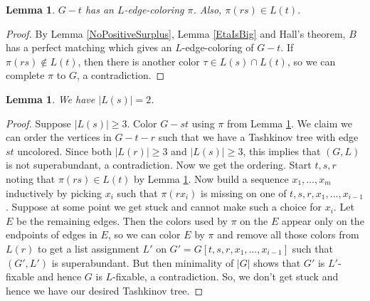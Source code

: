 \documentclass[12pt]{article}
\theoremstyle{plain}
\newtheorem{lem}[thm]{Lemma}
\theoremstyle{definition}
\theoremstyle{remark}
\begin{document}
	
	\begin{lem}\label{CanColorG-t}
		$G-t$ has an $L$-edge-coloring $\pi$.  Also, $\pi(rs) \in L(t)$.
	\end{lem}
	\begin{proof}
		By Lemma \ref{NoPositiveSurplus}, Lemma \ref{EtaIsBig} and Hall's theorem, $B$ has a perfect matching which gives an $L$-edge-coloring of $G-t$.  If $\pi(rs) \not \in L(t)$, then there is another color $\tau \in L(s) \cap L(t)$, so we can complete $\pi$ to $G$, a contradiction.
	\end{proof}
	
	\begin{lem}\label{SIsSmall}
		We have $|L(s)| = 2$.
	\end{lem}
	\begin{proof}
		Suppose $|L(s)| \ge 3$.  Color $G-st$ using $\pi$ from Lemma \ref{CanColorG-t}.  We claim we can order the vertices in $G-t-r$ such that we have a Tashkinov tree with edge $st$ uncolored.  Since both $|L(r)| \ge 3$ and $|L(s)| \ge 3$, this implies that $(G,L)$ is not superabundant, a contradiction.  Now we get the ordering. Start $t,s,r$ noting that $\pi(rs) \in L(t)$ by Lemma \ref{CanColorG-t}.  Now build a sequence $x_1, \ldots, x_m$ inductively by picking $x_i$ such that $\pi(rx_i)$ is missing on one of $t,s,r,x_1, \ldots, x_{i-1}$.  Suppose at some point we get stuck and cannot make such a choice for $x_i$.  Let $E$ be the remaining edges. Then the colors used by $\pi$ on the $E$ appear only on the endpoints of edges in $E$, so we can color $E$ by $\pi$ and remove all those colors from $L(r)$ to get a list assignment $L'$ on $G' = G[t,s,r, x_1, \ldots, x_{i-1}]$ such that $(G', L')$ is superabundant.  But then minimality of $|G|$ shows that $G'$ is $L'$-fixable and hence $G$ is $L$-fixable, a contradiction.  So, we don't get stuck and hence we have our desired Tashkinov tree.
	\end{proof}
	
\end{document}
